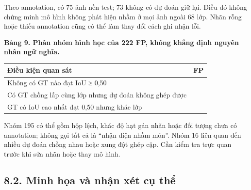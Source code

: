 \documentclass[
  vietnamese,
  12pt,
  a4paper,
]{article}
\newcounter{none} %
\begin{document}
\endgroup

Theo annotation, có 75 ảnh nền test; 73 không có dự đoán giữ lại. Điều
đó không chứng minh mô hình không phát hiện nhầm ở mọi ảnh ngoài 68 lớp.
Nhãn rỗng hoặc thiếu annotation cũng có thể làm thay đổi cách ghi nhận
lỗi.

\textbf{Bảng 9. Phân nhóm hình học của 222 FP, không khẳng định nguyên
nhân ngữ nghĩa.}

\begingroup\small\setlength{\tabcolsep}{4pt}\renewcommand{\arraystretch}{1.12}

{\def\LTcaptype{none} %
\begin{longtable}[]{@{}
  >{\raggedright\arraybackslash}p{}
  >{\raggedleft\arraybackslash}p{}@{}}
\toprule\noalign{}
\begin{minipage}[b]{\linewidth}\raggedright
Điều kiện quan sát
\end{minipage} & \begin{minipage}[b]{\linewidth}\raggedleft
FP
\end{minipage} \\
\midrule\noalign{}
\endhead
\bottomrule\noalign{}
\endlastfoot
Không có GT nào đạt IoU ≥ 0,50 & 195 \\
Có GT chồng lấp cùng lớp nhưng dự đoán không ghép được & 16 \\
GT có IoU cao nhất đạt 0,50 nhưng khác lớp & 11 \\
\end{longtable}
}

\endgroup

Nhóm 195 có thể gồm hộp lệch, khác độ hạt gán nhãn hoặc đối tượng chưa
có annotation; không gọi tất cả là ``nhận diện nhầm món''. Nhóm 16 liên
quan đến nhiều dự đoán chồng nhau hoặc xung đột ghép cặp. Cần kiểm tra
trực quan trước khi sửa nhãn hoặc thay mô hình.

\subsection{8.2. Minh họa và nhận xét cụ
thể}\label{minh-hux1ecda-vuxe0-nhux1eadn-xuxe9t-cux1ee5-thux1ec3}
\end{document}

